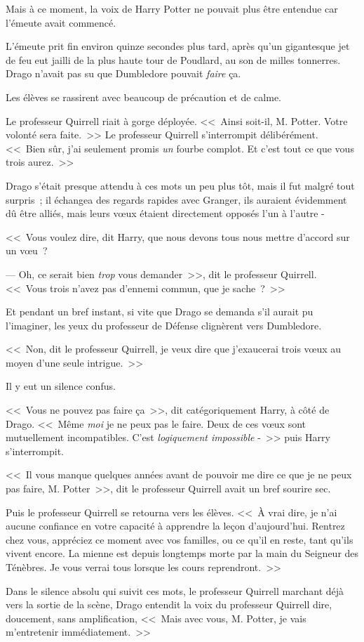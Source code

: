 Mais à ce moment, la voix de Harry Potter ne pouvait plus être entendue car l'émeute avait commencé.

\later

L'émeute prit fin environ quinze secondes plus tard, après qu'un gigantesque jet de feu eut jailli de la plus haute tour de Poudlard, au son de milles tonnerres. Drago n'avait pas su que Dumbledore pouvait \emph{faire} ça.

Les élèves se rassirent avec beaucoup de précaution et de calme.

Le professeur Quirrell riait à gorge déployée. <<~Ainsi soit-il, M. Potter. Votre volonté sera faite.~>> Le professeur Quirrell s'interrompit délibérément. <<~Bien sûr, j'ai seulement promis \emph{un} fourbe complot. Et c'est tout ce que vous trois aurez.~>>

Drago s'était presque attendu à ces mots un peu plus tôt, mais il fut malgré tout surpris~; il échangea des regards rapides avec Granger, ils auraient évidemment dû être alliés, mais leurs vœux étaient directement opposés l'un à l'autre -

<<~Vous voulez dire, dit Harry, que nous devons tous nous mettre d'accord sur un vœu~?

--- Oh, ce serait bien \emph{trop} vous demander~>>, dit le professeur Quirrell. <<~Vous trois n'avez pas d'ennemi commun, que je sache~?~>>

Et pendant un bref instant, si vite que Drago se demanda s'il aurait pu l'imaginer, les yeux du professeur de Défense clignèrent vers Dumbledore.

<<~Non, dit le professeur Quirrell, je veux dire que j'exaucerai trois vœux au moyen d'une seule intrigue.~>>

Il y eut un silence confus.

<<~Vous ne pouvez pas faire ça~>>, dit catégoriquement Harry, à côté de Drago. <<~Même \emph{moi} je ne peux pas le faire. Deux de ces vœux sont mutuellement incompatibles. C'est \emph{logiquement impossible} -~>> puis Harry s'interrompit.

<<~Il vous manque quelques années avant de pouvoir me dire ce que je ne peux pas faire, M. Potter~>>, dit le professeur Quirrell avait un bref sourire sec.

Puis le professeur Quirrell se retourna vers les élèves. <<~À vrai dire, je n'ai aucune confiance en votre capacité à apprendre la leçon d'aujourd'hui. Rentrez chez vous, appréciez ce moment avec vos familles, ou ce qu'il en reste, tant qu'ils vivent encore. La mienne est depuis longtemps morte par la main du Seigneur des Ténèbres. Je vous verrai tous lorsque les cours reprendront.~>>

Dans le silence absolu qui suivit ces mots, le professeur Quirrell marchant déjà vers la sortie de la scène, Drago entendit la voix du professeur Quirrell dire, doucement, sans amplification, <<~Mais avec vous, M. Potter, je vais m'entretenir immédiatement.~>> 

